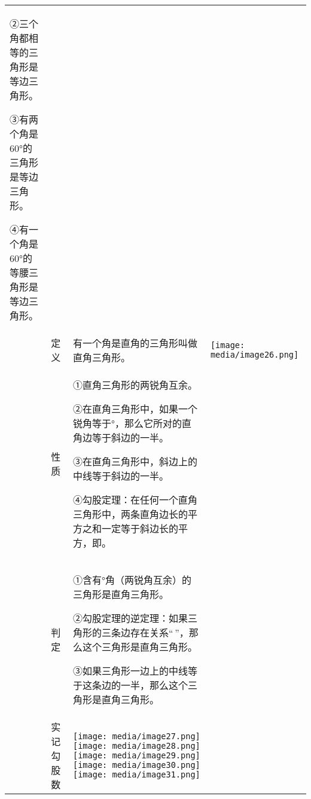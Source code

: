 \documentclass[a4paper,11pt,UTF8]{ctexart}
\begin{document}
\begin{longtable}[]{@{}llll@{}}
\begin{minipage}[t]{0.22\columnwidth}
②三个角都相等的三角形是等边三角形。

③有两个角是60°的三角形是等边三角形。

④有一个角是60°的等腰三角形是等边三角形。\strut
\end{minipage} & \begin{minipage}[t]{0.22\columnwidth}\raggedright
\strut
\end{minipage}\tabularnewline
& 定义 & 有一个角是直角的三角形叫做直角三角形。 &
\texttt{[image: media/image26.png]}\tabularnewline
\begin{minipage}[t]{0.22\columnwidth}\raggedright
\strut
\end{minipage} & \begin{minipage}[t]{0.22\columnwidth}\raggedright
性质\strut
\end{minipage} & \begin{minipage}[t]{0.22\columnwidth}\raggedright
①直角三角形的两锐角互余。

②在直角三角形中，如果一个锐角等于°，那么它所对的直角边等于斜边的一半。

③在直角三角形中，斜边上的中线等于斜边的一半。

④勾股定理：在任何一个直角三角形中，两条直角边长的平方之和一定等于斜边长的平方，即。\strut
\end{minipage} & \begin{minipage}[t]{0.22\columnwidth}\raggedright
\strut
\end{minipage}\tabularnewline
\begin{minipage}[t]{0.22\columnwidth}\raggedright
\strut
\end{minipage} & \begin{minipage}[t]{0.22\columnwidth}\raggedright
判定\strut
\end{minipage} & \begin{minipage}[t]{0.22\columnwidth}\raggedright
①含有°角（两锐角互余）的三角形是直角三角形。

②勾股定理的逆定理：如果三角形的三条边存在关系``\,''，那么这个三角形是直角三角形。

③如果三角形一边上的中线等于这条边的一半，那么这个三角形是直角三角形。\strut
\end{minipage} & \begin{minipage}[t]{0.22\columnwidth}\raggedright
\strut
\end{minipage}\tabularnewline
& 实记勾股数 &
\texttt{[image: media/image27.png]}\texttt{[image: media/image28.png]}\texttt{[image: media/image29.png]}\texttt{[image: media/image30.png]}\texttt{[image: media/image31.png]}
&\tabularnewline
\bottomrule
\end{longtable}
\end{document}
